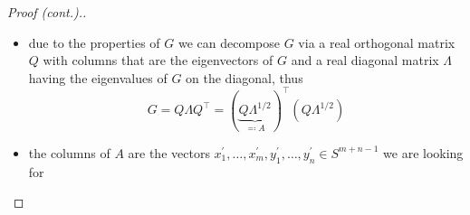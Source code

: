 	\begin{frame}
		\begin{proof}[Proof (cont.).]
			\begin{itemize}
				\item<1-> due to the properties of $G$ we can decompose $G$ via a real orthogonal matrix $Q$ with columns that are the eigenvectors of $G$ and a real diagonal matrix $\Lambda$ having the eigenvalues of $G$ on the diagonal, thus
					\begin{equation}
						G=Q\Lambda Q^\top =(\underbrace{Q\Lambda^{1/2}}_{\eqqcolon A})^\top(Q\Lambda^{1/2})
					\end{equation}
				\item<2-> the columns of $A$ are the vectors $x_1^\prime,\dots,x_m^\prime,y_1^\prime,\dots,y_n^\prime \in S^{m+n-1}$ we are looking for
			\end{itemize}
		\end{proof}
	\end{frame}
	
